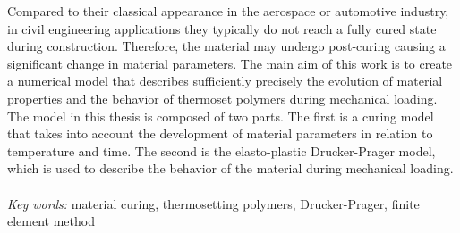 
Compared to their classical appearance in the aerospace or automotive industry, in civil engineering applications they typically do not reach a fully cured state during construction. Therefore, the material may undergo post-curing causing a significant change in material parameters. The main aim of this work is to create a numerical model that describes sufficiently precisely the evolution of material properties and the behavior of thermoset polymers during mechanical loading. The model in this thesis is composed of two parts. The first is a curing model that takes into account the development of material parameters in relation to temperature and time. The second is the elasto-plastic Drucker-Prager model, which is used to describe the behavior of the material during mechanical loading.
\\
\\

\noindent 
{\it Key words:} material curing, thermosetting polymers, Drucker-Prager, finite element method

%
